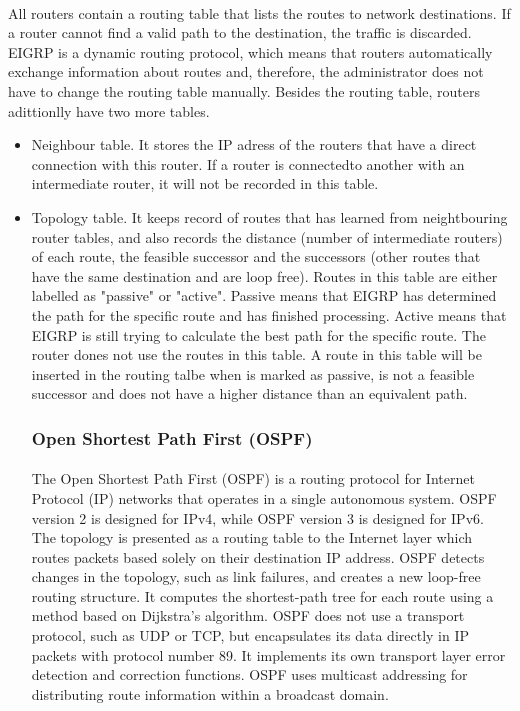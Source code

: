 \paragraph{}All routers contain a routing table that lists the routes to network destinations. If a router cannot find a valid path to the destination, the traffic is discarded. EIGRP is a dynamic routing protocol, which means that routers automatically exchange information about routes and, therefore, the administrator does not have to change the routing table manually. Besides the routing table, routers adittionlly have two more tables.
\begin{itemize}
\item Neighbour table. It stores the IP adress of the routers that have a direct connection with this router. If a router is connectedto another with an intermediate router, it will not be recorded in this table.
\item Topology table. It keeps record of routes that has learned from neightbouring router tables, and also records the distance (number of intermediate routers) of each route, the feasible successor and the successors (other routes that have the same destination and are loop free). Routes in this table are either labelled as "passive" or "active". Passive means that EIGRP  has determined the path for the specific route and has finished processing. Active means that EIGRP is still trying to calculate the best path for the specific route. The router dones not use the routes in this table. A route in this table will be inserted in the routing talbe when is marked as passive, is not a feasible successor and does not have a higher distance than an equivalent path.
\subsubsection*{Open Shortest Path First (OSPF)\cite{OSPFv2}\cite{OSPFIPv6}}
\paragraph{}The Open Shortest Path First (OSPF) is a routing protocol for Internet Protocol (IP) networks that operates in a single autonomous system. OSPF version 2 is designed for IPv4, while OSPF version 3 is designed for IPv6. The topology is presented as a routing table to the Internet layer which routes packets based solely on their destination IP address. OSPF detects changes in the topology, such as link failures, and creates a new loop-free routing structure. It computes the shortest-path tree for each route using a method based on Dijkstra's algorithm. OSPF does not use a transport protocol, such as UDP or TCP, but encapsulates its data directly in IP packets with protocol number 89. It implements its own transport layer error detection and correction functions. OSPF uses multicast addressing for distributing route information within a broadcast domain.


\end{itemize}
